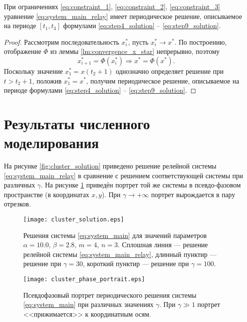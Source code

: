 \begin{theorem}
	\label{thm:periodic_relay_existence}
	При ограничениях \eqref{eq:constraint_1}, \eqref{eq:constraint_2}, \eqref{eq:constraint_3} уравнение \eqref{eq:system_main_relay} имеет периодическое решение, описываемое на периоде $[t_1, t_3]$ формулами \eqref{eq:step4_solution} -- \eqref{eq:step9_solution}.
\end{theorem}
\begin{proof}
	Рассмотрим последовательность $x^*_i$, пусть $x^*_i \to x^*$. По построению, отображение $\Phi$ из леммы \ref{lm:convergence_x_star} непрерывно, поэтому
	\[
	x^*_{i + 1} = \Phi(x^*_i) \Rightarrow x^* = \Phi(x^*).
	\]
	Поскольку значение $x^*_1 = x(t_2 + 1)$ однозначно определяет решение при $t > t_2 + 1$, положив $x^*_1 = x^*$, получим периодическое решение, описываемое на периоде формулами \eqref{eq:step4_solution} -- \eqref{eq:step9_solution}.
\end{proof}

\section{Результаты численного моделирования}\label{sec:ch3/sect5}

На рисунке \ref{fig:cluster_solution} приведено решение релейной системы \eqref{eq:system_main_relay} в сравнение с решением соответствующей системы при различных $\gamma$. На рисунке \ref{fig:phase_portrait} приведён портрет той же системы в псевдо-фазовом пространстве (в координатах $x, y$). При $\gamma \to +\infty$ портрет вырождается в пару отрезков.

\begin{figure}[!htb]
	\begin{minipage}{0.6\textwidth}
		\centering
		\texttt{[image: cluster\_solution.eps]}
		\caption{Решения системы \eqref{eq:system_main} для значений параметров $\alpha = 10.0$, $\beta = 2.8$, $m = 4$, $n = 3$. Сплошная линия --- решение релейной системы \eqref{eq:system_main_relay}, длинный пунктир --- решение при $\gamma = 30$, короткий пунктир --- решение при $\gamma = 100$.
		}
		\label{fig:cluster_solution}
	\end{minipage}\hfill
	\begin{minipage}{0.39\textwidth}
		\centering
		\texttt{[image: cluster\_phase\_portrait.eps]}
		\caption{Псевдофазовый портрет периодического решения системы \eqref{eq:system_main} при различных значениях $\gamma$. При $\gamma \gg 1$ портрет <<прижимается>> к координатным осям.}
		\label{fig:phase_portrait}
	\end{minipage}
\end{figure} 

